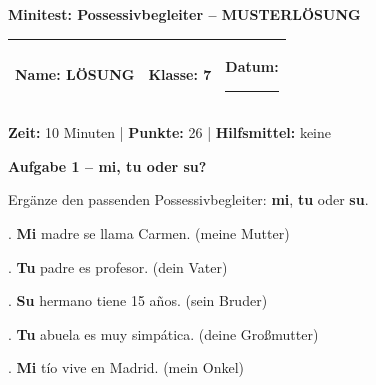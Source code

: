 \documentclass[11pt, a4paper]{article}
\newcommand{\fachfarbe}{spanisch}
\newcommand{\thema}{Minitest: Possessivbegleiter -- MUSTERLÖSUNG}
\newcommand{\klasse}{7}
\newcommand{\maxpunkte}{26}
\newcommand{\zeit}{10 Minuten}
\newcommand{\punktebox}[1]{\hfill\fbox{\small \_/#1}}
\newcommand{\luecke}[1]{\rule{#1}{0.4pt}}
\newcommand{\lsg}[1]{\textcolor{loesung}{\textbf{#1}}}
\newenvironment{aufgabe}[1]{%
    \needspace{5\baselineskip}%
    \nopagebreak[4]%
    \vspace{10pt}
    \noindent\textbf{\textcolor{\fachfarbe}{Aufgabe #1}}
    \nopagebreak[4]%
    \vspace{5pt}
    \nopagebreak[4]%
    \begin{list}{}{\leftmargin=0pt}
    \item[]
}{%
    \end{list}
}
\newcommand{\es}[1]{\textcolor{\fachfarbe}{\textbf{#1}}}
\begin{document}

\begin{center}
    {\Large\bfseries\textcolor{\fachfarbe}{\thema}}
\end{center}

\vspace{5pt}

\noindent
\begin{tabularx}{\textwidth}{|X|X|X|}
\hline
\textbf{Name:} \lsg{LÖSUNG} &
\textbf{Klasse:} \klasse &
\textbf{Datum:} \luecke{2cm} \\
\hline
\end{tabularx}

\vspace{10pt}

\begin{infobox}
\textbf{Zeit:} \zeit{} | \textbf{Punkte:} \maxpunkte{} | \textbf{Hilfsmittel:} keine
\end{infobox}

\vspace{15pt}


\begin{aufgabe}{1 -- mi, tu oder su?}
Ergänze den passenden Possessivbegleiter: \es{mi}, \es{tu} oder \es{su}. \punktebox{8}
\end{aufgabe}

. \lsg{Mi} madre se llama Carmen. \hfill (meine Mutter)

\vspace{0.8em}

. \lsg{Tu} padre es profesor. \hfill (dein Vater)

\vspace{0.8em}

. \lsg{Su} hermano tiene 15 años. \hfill (sein Bruder)

\vspace{0.8em}

. \lsg{Tu} abuela es muy simpática. \hfill (deine Großmutter)

\vspace{0.8em}

. \lsg{Mi} tío vive en Madrid. \hfill (mein Onkel)
\end{document}
